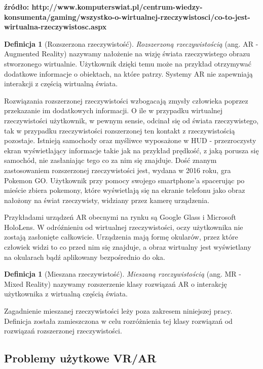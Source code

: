 \documentclass[a4paper,11pt,twoside]{report}
\theoremstyle{definition}
\newtheorem{definition}[theorem]{Definicja}
\begin{document}
\textbf {źródło: http://www.komputerswiat.pl/centrum-wiedzy-konsumenta/gaming/wszystko-o-wirtualnej-rzeczywistosci/co-to-jest-wirtualna-rzeczywistosc.aspx }

\begin{definition}[Rozszerzona rzeczywistość]
\textit{Rozszerzoną rzeczywistością} (ang. AR - Augmented Reality) nazywamy nałożenie na wizję świata rzeczywistego obrazu stworzonego wirtualnie. Użytkownik dzięki temu może na przykład otrzymywać dodatkowe informacje o obiektach, na które patrzy. Systemy AR nie zapewniają interakcji z częścią wirtualną świata.
\end{definition}

Rozwiązania rozszerzonej rzeczywistości wzbogacają zmysły człowieka poprzez przekazanie im dodatkowych informacji. O ile w przypadku wirtualnej rzeczywistości użytkownik, w pewnym sensie, odcinał się od świata rzeczywistego, tak w przypadku rzeczywistości rozszerzonej ten kontakt z rzeczywistością pozostaje. Istnieją samochody oraz myśliwce wyposażone w HUD - przezroczysty ekran wyświetlający informacje takie jak na przykład prędkość, z jaką porusza się samochód, nie zasłaniając tego co za nim się znajduje. Dość znanym zastosowaniem rozszerzonej rzeczywistości jest, wydana w 2016 roku, gra Pokemon GO. Użytkownik przy pomocy swojego smartphone'a spacerując po mieście zbiera pokemony, które wyświetlają się na ekranie telefonu jako obraz nałożony na  świat rzeczywisty, widziany przez kamerę urządzenia.

Przykładami urządzeń AR obecnymi na rynku są Google Glass i Microsoft HoloLens. W odróźnieniu od wirtualnej rzeczywistości, oczy użytkownika nie zostają zasłonięte całkowicie. Urządzenia mają formę okularów, przez które człowiek widzi to co przed nim się znajduje, a obraz wirtualny jest wyświetlany na okularach bądź aplikowany bezpośrednio do oka.

\begin{definition}[Mieszana rzeczywistość]
\textit{Mieszaną rzeczywistością} (ang. MR - Mixed Reality) nazywamy rozszerzenie klasy rozwiązań AR o interakcję użytkownika z wirtualną częścią świata.
\end{definition}

Zagadnienie mieszanej rzeczywistości leży poza zakresem niniejszej pracy. Definicja została zamieszczona w celu rozróżnienia tej klasy rozwiązań od rozwiązań rozszerzonej rzeczywistości.

\subsection { Problemy użytkowe VR/AR }
\end{document}
